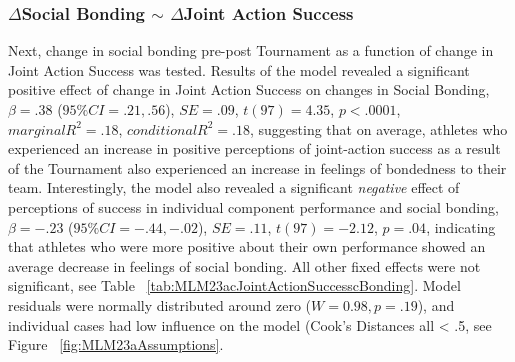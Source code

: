 \documentclass[12pt]{report}
\begin{document}
{%





\subsubsection{$\Delta$Social Bonding $\sim$ $\Delta$Joint Action Success}
Next, change in social bonding pre-post Tournament as a function of change in Joint Action Success was tested. Results of the model revealed a significant positive effect of change in Joint Action Success on changes in Social Bonding, $\beta = .38$ ($95\% CI =  .21, .56$), $SE = .09$, $t(97) = 4.35$, $p < .0001$, $marginal R^2 = .18$, $conditional R^2 = .18$, suggesting that on average, athletes who experienced an increase in positive perceptions of joint-action success as a result of the Tournament also experienced an increase in feelings of bondedness to their team.  Interestingly, the model also revealed a significant \textit{negative} effect of perceptions of success in individual component performance and social bonding, $\beta = -.23$ ($95\% CI =  -.44, -.02$), $SE = .11$, $t(97) = -2.12$, $p = .04$, indicating that athletes who were more positive about their own performance showed an average decrease in feelings of social bonding. All other fixed effects were not significant, see Table ~\ref{tab:MLM23acJointActionSuccesscBonding}. Model residuals were normally distributed around zero ($W = 0.98, p = .19$), and individual cases had low influence on the model (Cook's Distances all < .5, see Figure ~\ref{fig:MLM23aAssumptions}.





}
\end{document}
